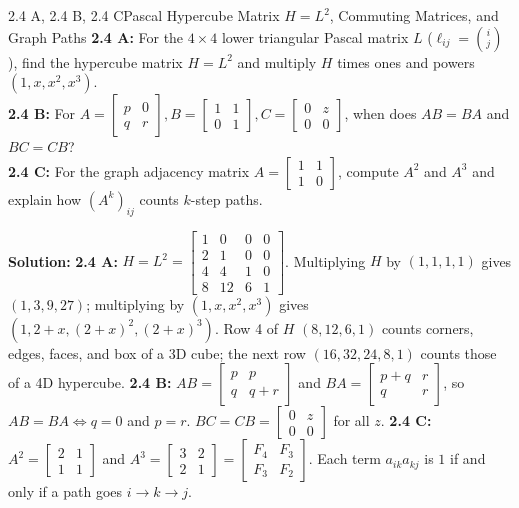 \documentclass[11pt,a4paper,openany,oneside]{book}
\numberwithin{equation}{chapter}
\begin{document}
\begin{example}{2.4 A, 2.4 B, 2.4 C}{Pascal Hypercube Matrix $H=L^2$, Commuting Matrices, and Graph Paths}
\textbf{2.4 A:} For the $4\times 4$ lower triangular Pascal matrix $L$ ($\ell_{ij} = \binom{i}{j}$), find the hypercube matrix $H = L^2$ and multiply $H$ times ones and powers $(1, x, x^2, x^3)$.\\
\textbf{2.4 B:} For $A = \begin{bmatrix}p&0\\q&r\end{bmatrix}, B = \begin{bmatrix}1&1\\0&1\end{bmatrix}, C = \begin{bmatrix}0&z\\0&0\end{bmatrix}$, when does $AB = BA$ and $BC = CB$?\\
\textbf{2.4 C:} For the graph adjacency matrix $A = \begin{bmatrix}1&1\\1&0\end{bmatrix}$, compute $A^2$ and $A^3$ and explain how $(A^k)_{ij}$ counts $k$-step paths.
\end{example}
\textbf{Solution:}
\textbf{2.4 A:} $H = L^2 = \begin{bmatrix}1&0&0&0\\2&1&0&0\\4&4&1&0\\8&12&6&1\end{bmatrix}$. Multiplying $H$ by $(1,1,1,1)$ gives $(1,3,9,27)$; multiplying by $(1,x,x^2,x^3)$ gives $(1, 2+x, (2+x)^2, (2+x)^3)$. Row 4 of $H$ $(8,12,6,1)$ counts corners, edges, faces, and box of a 3D cube; the next row $(16,32,24,8,1)$ counts those of a 4D hypercube.
\textbf{2.4 B:} $AB = \begin{bmatrix}p & p\\q & q+r\end{bmatrix}$ and $BA = \begin{bmatrix}p+q & r\\q & r\end{bmatrix}$, so $AB=BA \iff q=0$ and $p=r$. $BC = CB = \begin{bmatrix}0&z\\0&0\end{bmatrix}$ for all $z$.
\textbf{2.4 C:} $A^2 = \begin{bmatrix}2&1\\1&1\end{bmatrix}$ and $A^3 = \begin{bmatrix}3&2\\2&1\end{bmatrix} = \begin{bmatrix}F_4 & F_3\\F_3 & F_2\end{bmatrix}$. Each term $a_{ik}a_{kj}$ is $1$ if and only if a path goes $i \to k \to j$.
\end{document}
